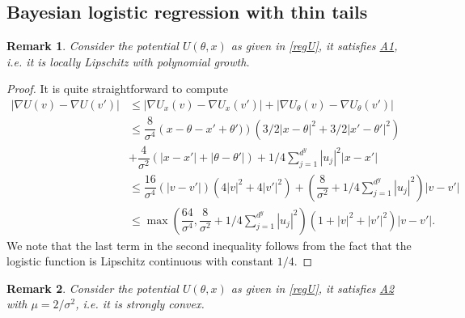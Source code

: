 \documentclass[a4paper, 10pt]{article}
\theoremstyle{plain}%
\newtheorem{remark}{Remark}
\begin{document}
\subsection{Bayesian logistic regression with thin tails}
\begin{remark}\label{remark3}
    Consider the potential $U(\theta,x)$ as given in \eqref{regU}, it satisfies \hyperlink{Assum1}{A1}, i.e. it is locally Lipschitz with polynomial growth.
\end{remark}
\begin{proof}
     It is quite straightforward to compute
\begin{align*}
    |\nabla U(v)-\nabla U(v')|&\leq |\nabla U_x(v)-\nabla U_x(v')|+ |\nabla U_{\theta}(v)-\nabla U_{\theta}(v')|\\
    &\leq \dfrac{8}{\sigma^4}\left(x-\theta-x'+\theta')\right)\left(3/2|x-\theta|^2+3/2|x'-\theta'|^2\right)\\&+\dfrac{4}{\sigma^2}\left(|x-x'|+|\theta-\theta'|\right)+1/4\sum_{j=1}^{d^y}|u_j|^2|x-x'|\\
    &\leq \dfrac{16}{\sigma^4}\left(|v-v'|\right)\left(4|v|^2+4|v'|^2\right)+\left(\dfrac{8}{\sigma^2}+1/4\sum_{j=1}^{d^y}|u_j|^2\right)|v-v'|\\
    &\leq \max\left(\dfrac{64}{\sigma^4},\dfrac{8}{\sigma^2}+1/4\sum_{j=1}^{d^y}|u_j|^2\right)\left(1+|v|^2+|v'|^2\right)|v-v'|.
\end{align*}
We note that the last term in the second inequality follows from the fact that the logistic function is Lipschitz continuous with constant $1/4$.
\end{proof}
\begin{remark}\label{remark4}
    Consider the potential $U(\theta,x)$ as given in \eqref{regU}, it satisfies \hyperlink{Assum2}{A2} with $\mu=2/\sigma^2$, i.e. it is strongly convex.
\end{remark}
\end{document}
